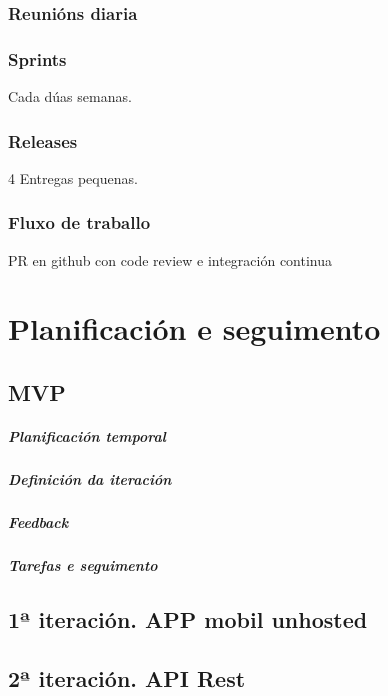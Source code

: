 \documentclass[a4paper,spanish,10p,titlepage]{report}
\begin{document}
    \subsection{Reunións diaria}
    
    \subsection{Sprints}
    Cada dúas semanas.

    \subsection{Releases}
    4 Entregas pequenas.

    \subsection{Fluxo de traballo}
    PR en github con code review e integración continua

\clearpage


\chapter{Planificación e seguimento}

  \section{MVP}
    \paragraph{Planificación temporal}
    \paragraph{Definición da iteración}
    \paragraph{Feedback}
    \paragraph{Tarefas e seguimento}
  \section{1ª iteración. APP mobil unhosted}
  \section{2ª iteración. API Rest}
\end{document}

